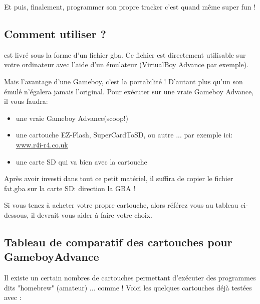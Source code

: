\documentclass[12pt,a4paper]{article}
\begin{document}
    Et puis, finalement, programmer son propre tracker c'est quand même super fun ! 
    
    
    \subsection{Comment utiliser \FAT ?}

    \FAT est livré sous la forme d'un fichier gba. Ce fichier est directement utilisable sur votre ordinateur avec l'aide d'un émulateur (VirtualBoy Advance par exemple).\medskip
    
    Mais l'avantage d'une Gameboy, c'est la portabilité ! D'autant plus qu'un son émulé n'égalera jamais l'original. Pour exécuter \FAT sur une vraie Gameboy Advance, il vous faudra:
    \begin{itemize}
        \item{une vraie Gameboy Advance(scoop!)}
        \item{une cartouche EZ-Flash, SuperCardToSD, ou autre ... par exemple ici: \href{http://www.r4i-r4.co.uk/products/EZ-Flash-iV-GBA-Mini-Card-for-Nintendo-GBA-and-DS-Lite.html}{www.r4i-r4.co.uk}}
        \item{une carte SD qui va bien avec la cartouche} 
    \end{itemize}\medskip
    
    Après avoir investi dans tout ce petit matériel, il suffira de copier le fichier fat.gba sur la carte SD: direction la GBA !
    
    
    Si vous tenez à acheter votre propre cartouche, alors référez vous au tableau ci-dessous, il devrait vous aider à faire votre choix.
    
    \subsection{Tableau de comparatif des cartouches pour GameboyAdvance}
    
    Il existe un certain nombres de cartouches permettant d'exécuter des programmes dits "homebrew" (amateur) ... comme \FAT ! Voici les quelques cartouches déjà testées avec \FAT :
\end{document}
